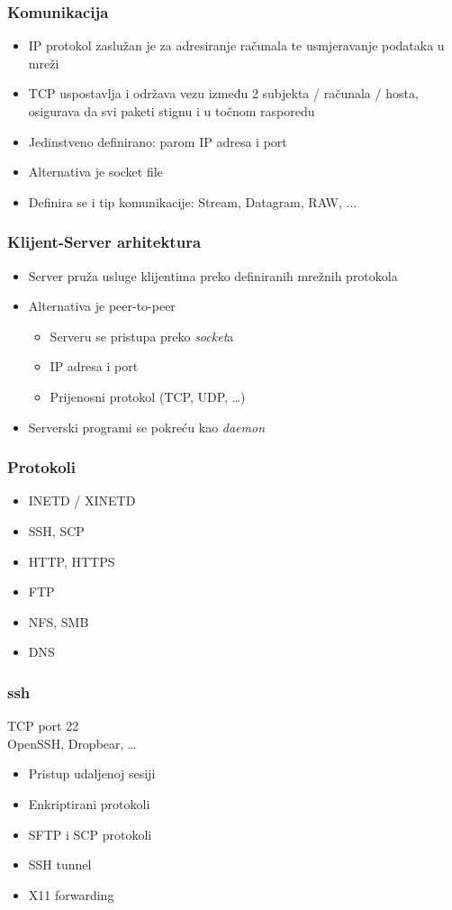 \documentclass[t,table,usenames,dvipsnames]{beamer}
\begin{document}
\begin{frame}
	\frametitle{Komunikacija}
    \begin{itemize}
        \item IP protokol zaslužan je za adresiranje računala te usmjeravanje podataka u mreži
        \item TCP uspostavlja i održava vezu između 2 subjekta / računala / hosta, osigurava da svi paketi stignu i u točnom rasporedu
        \item Jedinstveno definirano: parom IP adresa i port
        \item Alternativa je socket file
        \item Definira se i tip komunikacije: Stream, Datagram, RAW, ...
    \end{itemize}
\end{frame}


\begin{frame}
    \frametitle{Klijent-Server arhitektura}
	\begin{itemize}
		\item Server pruža usluge klijentima preko definiranih mrežnih protokola
        \item Alternativa je peer-to-peer
		\begin{itemize}
			\item Serveru se pristupa preko \textit{socket}a
			\item[] IP adresa i port
			\item[] Prijenosni protokol (TCP, UDP, \ldots)
		\end{itemize}
		\item Serverski programi se pokreću kao \emph{daemon}
	\end{itemize}
\end{frame}


\begin{frame}
    \frametitle{Protokoli}
    \begin{itemize}
        \item INETD / XINETD 
        \item SSH, SCP
        \item HTTP, HTTPS
        \item FTP
        \item NFS, SMB
        \item DNS
    \end{itemize}
\end{frame}


\begin{frame}
	\frametitle{ssh}

	TCP port 22\\
	OpenSSH, Dropbear, \ldots

	\begin{itemize}
		\item Pristup udaljenoj sesiji
		\item Enkriptirani protokoli
		\item SFTP i SCP protokoli
		\item SSH tunnel
		\item[] X11 forwarding
	\end{itemize}
\end{frame}
\end{document}
